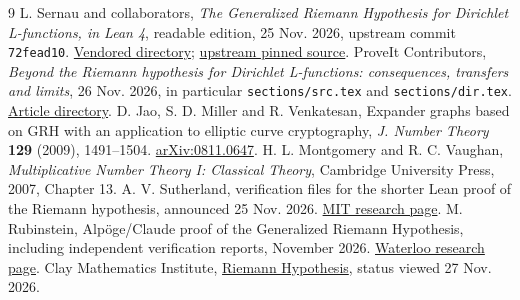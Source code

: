 \documentclass[11pt]{article}
\theoremstyle{remark}\newtheorem{remark}[theorem]{Remark}
\begin{document}
\begin{thebibliography}{9}
 L. Sernau and collaborators, \emph{The Generalized Riemann Hypothesis for Dirichlet L-functions, in Lean 4}, readable edition, 25 Nov. 2026, upstream commit \texttt{72fead10}. \href{https://github.com/VladimirReshetnikov/ProveIt/tree/main/Analysis/GeneralizedRiemannHypothesis/vendor/grh-lean}{Vendored directory}; \href{https://github.com/lsernau/grh-lean/tree/72fead102f663d5c7a407964a13dc0cf9d977207/grh}{upstream pinned source}.
 ProveIt Contributors, \emph{Beyond the Riemann hypothesis for Dirichlet L-functions: consequences, transfers and limits}, 26 Nov. 2026, in particular \texttt{sections/src.tex} and \texttt{sections/dir.tex}. \href{https://github.com/VladimirReshetnikov/ProveIt/tree/main/Analysis/GeneralizedRiemannHypothesis/Article}{Article directory}.
 D. Jao, S. D. Miller and R. Venkatesan, Expander graphs based on GRH with an application to elliptic curve cryptography, \emph{J. Number Theory} \textbf{129} (2009), 1491--1504. \href{https://arxiv.org/abs/0811.0647}{arXiv:0811.0647}.
 H. L. Montgomery and R. C. Vaughan, \emph{Multiplicative Number Theory I: Classical Theory}, Cambridge University Press, 2007, Chapter 13.
 A. V. Sutherland, verification files for the shorter Lean proof of the Riemann hypothesis, announced 25 Nov. 2026. \href{https://math.mit.edu/~drew/}{MIT research page}.
 M. Rubinstein, Alp\"oge/Claude proof of the Generalized Riemann Hypothesis, including independent verification reports, November 2026. \href{https://www.math.uwaterloo.ca/~mrubinst/alpoge_claude_grh/}{Waterloo research page}.
 Clay Mathematics Institute, \href{https://www.claymath.org/millennium/Riemann-Hypothesis/}{Riemann Hypothesis}, status viewed 27 Nov. 2026.
\end{thebibliography}
\end{document}
